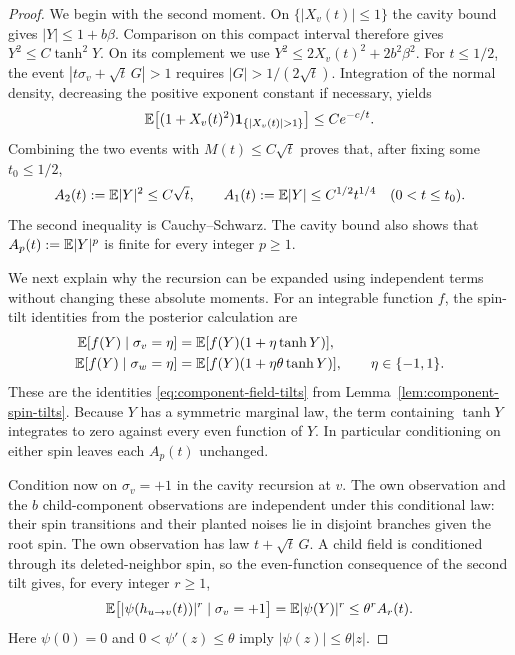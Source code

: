 \begin{proof}
We begin with the second moment.  On $\{|X_v(t)|\le1\}$ the cavity
bound gives $|Y|\le1+b\beta$.  Comparison on this compact interval
therefore gives $Y^2\le C\tanh^2Y$.  On its complement we use
$Y^2\le2X_v(t)^2+2b^2\beta^2$.  For $t\le1/2$, the event
$|t\sigma_v+\sqrt t\,G|>1$ requires $|G|>1/(2\sqrt t)$.
Integration of the normal density, decreasing the positive exponent
constant if necessary, yields
\[
 \E\bigl[(1+X_v(t)^2)\mathbf 1_{\{|X_v(t)|>1\}}\bigr]
 \le C e^{-c/t}.
\]
Combining the two events with $M(t)\le C\sqrt t$ proves that, after
fixing some $t_0\le1/2$,
\begin{equation}
 A_2(t):=\mathbb E|Y|^2\le C\sqrt t,
 \qquad A_1(t):=\mathbb E|Y|\le C^{1/2}t^{1/4}
 \quad(0<t\le t_0).
 \label{eq:critical-moment-base}
\end{equation}
The second inequality is Cauchy--Schwarz.  The cavity bound also shows
that $A_p(t):=\mathbb E|Y|^p$ is finite for every integer $p\ge1$.

We next explain why the recursion can be expanded using independent
terms without changing these absolute moments.  For an integrable
function $f$, the spin-tilt identities from the posterior calculation
are
\begin{align*}
 \mathbb E[f(Y)\mid\sigma_v=\eta]
   &=\mathbb E[f(Y)(1+\eta\tanh Y)],\\
 \mathbb E[f(Y)\mid\sigma_w=\eta]
   &=\mathbb E[f(Y)(1+\eta\theta\tanh Y)],
 \qquad \eta\in\{-1,1\}.
\end{align*}
These are the identities \eqref{eq:component-field-tilts} from
Lemma~\ref{lem:component-spin-tilts}.
Because $Y$ has a symmetric marginal law, the term containing
$\tanh Y$ integrates to zero against every even function of $Y$.
In particular conditioning on either spin leaves each $A_p(t)$
unchanged.

Condition now on $\sigma_v=+1$ in the cavity recursion at $v$.
The own observation and the $b$ child-component observations are
independent under this conditional law: their spin transitions and
their planted noises lie in disjoint branches given the root spin.
The own observation has law $t+\sqrt t\,G$.  A child field is
conditioned through its deleted-neighbor spin, so the even-function
consequence of the second tilt gives, for every integer $r\ge1$,
\begin{equation}
 \mathbb E\bigl[|\psi(h_{u\to v}(t))|^r\mid\sigma_v=+1\bigr]
   =\mathbb E|\psi(Y)|^r\le\theta^r A_r(t).
 \label{eq:child-absolute-moments}
\end{equation}
Here $\psi(0)=0$ and $0<\psi'(z)\le\theta$ imply
$|\psi(z)|\le\theta|z|$.


\end{proof}
